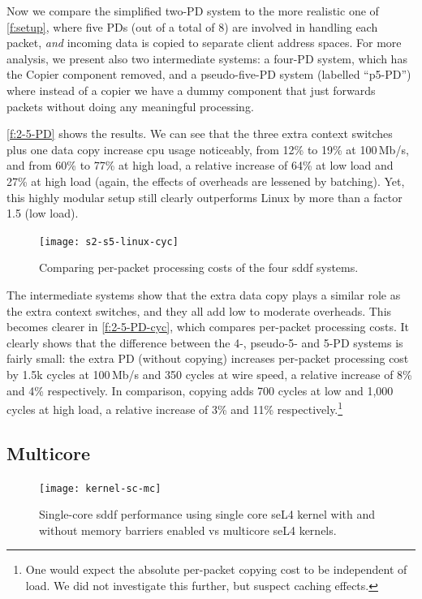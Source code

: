 \documentclass[a4paper,12pt]{report}
\begin{document}
Now we compare the simplified two-PD system to the more realistic one
of \autoref{f:setup}, where five PDs (out of a total of 8) are involved in handling each
packet, \emph{and} incoming data is copied to separate client address
spaces. For more analysis, we present also two intermediate systems: a
four-PD system, which has the Copier component removed, and a
pseudo-five-PD system (labelled ``p5-PD'') where instead of a copier
we have a dummy component that just forwards packets without doing any
meaningful processing.

\autoref{f:2-5-PD} shows the results.
We can see that the three extra context switches plus one data copy
increase \gls{cpu} usage noticeably, from 12\% to 19\% at 100\,Mb/s,
and from 60\% to 77\% at high load, a relative increase of 64\%
at low load and 27\% at high load (again, the effects of overheads are
lessened by batching).
Yet, this highly modular setup still clearly outperforms Linux by
more than a factor 1.5 (low load).

\begin{figure}[t]
  \centering
  \texttt{[image: s2-s5-linux-cyc]}
  \caption{Comparing per-packet processing costs of the four \gls{sddf} systems.}
  \label{f:2-5-PD-cyc}
\end{figure}

The intermediate systems show that the extra data copy plays a similar
role as the extra context switches, and they all add low to moderate
overheads. This becomes clearer in \autoref{f:2-5-PD-cyc}, which
compares per-packet processing costs. It clearly shows that the
difference between the 4-, pseudo-5- and 5-PD systems is fairly
small: the extra PD (without copying) increases per-packet processing cost by
1.5k cycles at 100\,Mb/s and 350 cycles
at wire speed, a relative increase of 8\% and 4\% respectively. In
comparison, copying adds 700 cycles at low and 1,000 cycles at high
load, a relative increase of 3\% and 11\% respectively.\footnote{One
  would expect the absolute per-packet copying cost to be independent of
  load. We did not investigate this further, but suspect caching effects.}

\subsection{Multicore}

\begin{figure}[t]
  \centering
  \texttt{[image: kernel-sc-mc]}
  \caption[Single-core \gls{sddf} performance with single- and multicore
  configurations.]{Single-core \gls{sddf} performance using single core seL4
    kernel with and without memory barriers enabled vs multicore
  seL4 kernels.}
  \label{f:kernel-sc-mc}
\end{figure}
\end{document}
